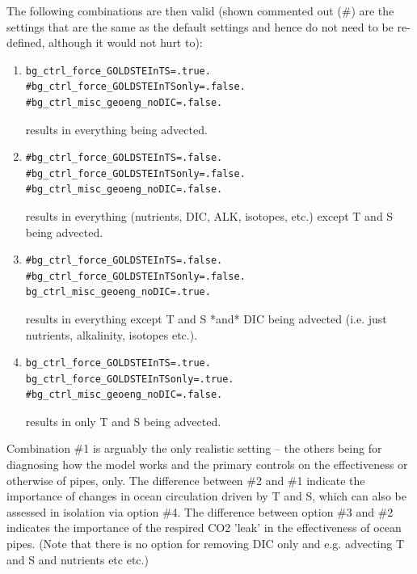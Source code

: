 \documentclass[11pt,fleqn]{book} %
\begin{document}
\begin{itemize}
\begin{itemize}
\end{itemize}

The following combinations are then valid (shown commented out (\#) are the settings that are the same as the default settings and hence do not need to be re-defined, although it would not hurt to):

          \begin{enumerate}
\vspace{1mm}
        \item 
        \begin{verbatim}
bg_ctrl_force_GOLDSTEInTS=.true.
#bg_ctrl_force_GOLDSTEInTSonly=.false.
#bg_ctrl_misc_geoeng_noDIC=.false.
        \end{verbatim}
\vspace{-4mm}
        results in everything being advected.
\vspace{1mm}
        \item 
        \begin{verbatim}
#bg_ctrl_force_GOLDSTEInTS=.false.
#bg_ctrl_force_GOLDSTEInTSonly=.false.
#bg_ctrl_misc_geoeng_noDIC=.false.
        \end{verbatim}
\vspace{-4mm}
        results in everything (nutrients, DIC, ALK, isotopes, etc.) except T and S being advected.
\vspace{1mm}
        \item 
        \begin{verbatim}
#bg_ctrl_force_GOLDSTEInTS=.false.
#bg_ctrl_force_GOLDSTEInTSonly=.false.
bg_ctrl_misc_geoeng_noDIC=.true.
        \end{verbatim}
\vspace{-4mm}
        results in everything except T and S *and* DIC being advected (i.e. just nutrients, alkalinity, isotopes etc.).
\vspace{1mm}
        \item 
        \begin{verbatim}
bg_ctrl_force_GOLDSTEInTS=.true.
bg_ctrl_force_GOLDSTEInTSonly=.true.
#bg_ctrl_misc_geoeng_noDIC=.false.
        \end{verbatim}
\vspace{-4mm}
        results in only T and S being advected.
        
\end{enumerate}
\vspace{2mm}

Combination \#1 is arguably the only realistic setting -- the others being for diagnosing how the model works and the primary controls on the effectiveness or otherwise of pipes, only. The difference between \#2 and \#1 indicate the importance of changes in ocean circulation driven by T and S, which can also be assessed in isolation via option \#4. The difference between option \#3 and \#2 indicates the importance of the respired CO2 'leak' in the effectiveness of ocean pipes. (Note that there is no option for removing DIC only and e.g. advecting T and S and nutrients etc etc.)

\end{itemize}
\end{document}
